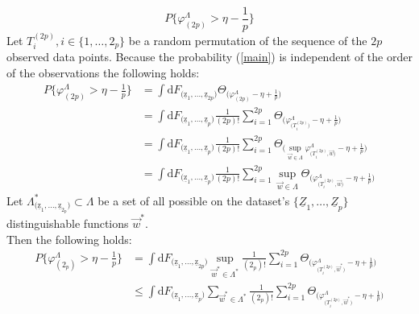 \begin{equation} \label{main}
	P\Big\{ \varphi_{ (2p) }^\Lambda > \eta - \frac{1}{p} \Big\}
\end{equation}
Let $T_i^{ (2p) }, i \in \big\{ 1, \ldots, 2_p \big\}$ be a random permutation of the sequence of the $2p$ observed data points. Because the probability (\ref{main}) is independent of the order of the observations the following holds:
\begin{equation}
	\begin{array}{ll}
	P\Big\{ \varphi_{ (2p) }^\Lambda > \eta - \frac{1}{p}\Big\}
	& = \int \mathrm{d} 
		F_{ \big( \mathrm{\underline{z}}_1, \ldots,
			\mathrm{\underline{z}}_{2p} \big) } 
		\Theta_{ \Big( 
			\varphi_{ (2p) }^\Lambda - \eta + \frac{1}{p} 
			\Big) } \\	
	& = \int \mathrm{d} 
		F_{ \big( \mathrm{\underline{z}}_1, \ldots,
			\mathrm{\underline{z}}_p \big) } 
		\frac{1}{ ( 2p ) \mathrm{!} }
		\sum_{i = 1}^{ 2p }
		\Theta_{ \bigg( 
			\varphi_{ \big( T_i^{ (2p) } \big) }^\Lambda 
			- \eta + \frac{1}{p} \bigg) } \\
	& = \int \mathrm{d} 
		F_{ \big( \mathrm{\underline{z}}_1, \ldots,
			\mathrm{\underline{z}}_p \big) } 
		\frac{1}{ ( 2p ) \mathrm{!} }
		\sum_{i = 1}^{ 2p }
		\Theta_{ \bigg( \sup_{ \vec{w} \in \Lambda } 
			\varphi_{ \big( T_i^{ (2p) },
				\vec{w}
			\big) }^\Lambda 
			- \eta + \frac{1}{p} \bigg) } \\
	& = \int \mathrm{d} 
		F_{ \big( \mathrm{\underline{z}}_1, \ldots,
			\mathrm{\underline{z}}_p \big) } 
		\frac{1}{ ( 2p ) \mathrm{!} }
		\sum_{i = 1}^{ 2p }
		\sup_{ \vec{w} \in \Lambda }
		\Theta_{ \bigg(  
			\varphi_{ \big( T_i^{ (2p) },
				\vec{w}
			\big) }^\Lambda 
			- \eta + \frac{1}{p} \bigg) }
	\end{array}
\end{equation}
Let $\Lambda_{ \big( \mathrm{ \underline{z}_1 }, \ldots, \mathrm{ \underline{z}_{2_p} } \big) }^* \subset \Lambda$ be a set of all possible on the dataset's $\big\{ \underline{Z}_1, \ldots, \underline{Z}_p \big\}$ distinguishable functions $\vec{w}^*$.\\
Then the following holds:
\begin{equation}
	\begin{array}{ll}
	P\Big\{ \varphi_{ (2_p) }^\Lambda > \eta - \frac{1}{p}\Big\}
	& = \int \mathrm{d} 
		F_{ \big( \mathrm{\underline{z}}_1, \ldots,
			\mathrm{\underline{z}}_{2p} \big) }
		\sup_{ \vec{w}^* \in \Lambda^* }
		\frac{1}{ ( 2_p ) \mathrm{!} }
		\sum_{i = 1}^{ 2p }
		\Theta_{ \bigg( 
			\varphi_{ \big( T_i^{ (2p) }, \vec{w}^* 
			\big) }^\Lambda 
			- \eta + \frac{1}{p} \bigg) } \\
	& \leq \int \mathrm{d} 
		F_{ \big( \mathrm{\underline{z}}_1, \ldots,
			\mathrm{\underline{z}}_p \big) }
		\sum_{ \vec{w}^* \in \Lambda^* }
		\frac{1}{ ( 2_p ) \mathrm{!} }
		\sum_{i = 1}^{ 2p }
		\Theta_{ \bigg( 
			\varphi_{ \big( T_i^{ (2p) }, \vec{w}^* 
			\big) }^\Lambda 
			- \eta + \frac{1}{p} \bigg) } \\
	\end{array}
\end {equation}
